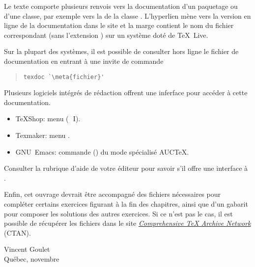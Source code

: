 Le texte comporte plusieurs renvois vers la documentation d'un
paquetage ou d'une classe, par exemple vers la %
de la classe . L'hyperlien mène vers la version en ligne
de la documentation dans le site %
 et la marge contient le nom du
fichier correspondant (sans l'extension ) sur un système
doté de {\TeX}~Live.

Sur la plupart des systèmes, il est possible de consulter hors ligne
le fichier de documentation  en entrant à une
invite de commande
\begin{quote}
\begin{lstlisting}[backgroundcolor=\color{white}]
texdoc `\meta{fichier}'
\end{lstlisting}
\end{quote}
Plusieurs logiciels intégrés de rédaction offrent une inferface pour
accéder à cette documentation.
\begin{itemize}
\item TeXShop: menu  (\optkey\,\cmdkey\, I).
\item Texmaker: menu .
\item GNU~Emacs: commande  () du mode
  spécialisé AUC{\TeX}.
\end{itemize}
Consulter la rubrique d'aide de votre éditeur pour savoir s'il offre
une interface à .

%

Enfin, cet ouvrage devrait être accompagné des fichiers nécessaires
pour compléter certains exercices figurant à la fin des chapitres,
ainsi que d'un gabarit  pour composer
les solutions des autres exercices. Si ce n'est pas le cas, il est
possible de récupérer les fichiers dans le site
\href{\ctanurl}{\emph{Comprehensive TeX Archive Network}} (CTAN).

\begin{flushright}
  Vincent Goulet \\
  Québec, novembre \year
\end{flushright}

